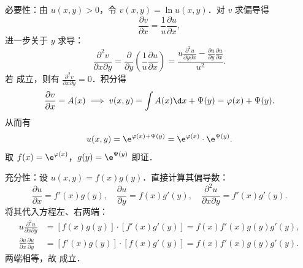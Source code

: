 \begin{myproof}

    必要性：由 $u(x, y) > 0$，令 $v(x, y) = \ln u(x, y)$．对 $v$ 求偏导得
    \begin{equation}
        \frac{\partial v}{\partial x} = \frac{1}{u} \frac{\partial u}{\partial x},
        \label{eq:vx-pde}
    \end{equation}
    进一步关于 $y$ 求导：
    \begin{equation}
        \frac{\partial^2 v}{\partial x \partial y} = \frac{\partial}{\partial y} \left( \frac{1}{u} \frac{\partial u}{\partial x} \right) = \frac{u \frac{\partial^2 u}{\partial y \partial x} - \frac{\partial u}{\partial y} \frac{\partial u}{\partial x}}{u^2}.
        \label{eq:vxy-pde}
    \end{equation}
    若  成立，则有 $\frac{\partial^2 v}{\partial x \partial y} = 0$．积分得
    \begin{equation}
        \frac{\partial v}{\partial x} = A(x) \implies v(x, y) = \int A(x) \d x + \Psi(y) = \varphi(x) + \Psi(y).
        \label{eq:v-integral}
    \end{equation}
    从而有
    \begin{equation}
        u(x, y) = \e^{\varphi(x) + \Psi(y)} = \e^{\varphi(x)} \cdot \e^{\Psi(y)}.
        \label{eq:u-sep-form}
    \end{equation}
    取 $f(x) = \e^{\varphi(x)}$，$g(y) = \e^{\Psi(y)}$ 即证．

    充分性：设 $u(x, y) = f(x)g(y)$．直接计算其偏导数：
    \begin{equation}
        \frac{\partial u}{\partial x} = f'(x)g(y), \quad \frac{\partial u}{\partial y} = f(x)g'(y), \quad \frac{\partial^2 u}{\partial x \partial y} = f'(x)g'(y).
        \label{eq:suff-deriv}
    \end{equation}
    将其代入方程左、右两端：
    \begin{equation}
        \begin{aligned}
            u \frac{\partial^2 u}{\partial x \partial y}                & = [f(x)g(y)] \cdot [f'(x)g'(y)] = f(x)f'(x)g(y)g'(y), \\
            \frac{\partial u}{\partial x} \frac{\partial u}{\partial y} & = [f'(x)g(y)] \cdot [f(x)g'(y)] = f(x)f'(x)g(y)g'(y).
        \end{aligned}
        \label{eq:suff-verify}
    \end{equation}
    两端相等，故  成立．
\end{myproof}


